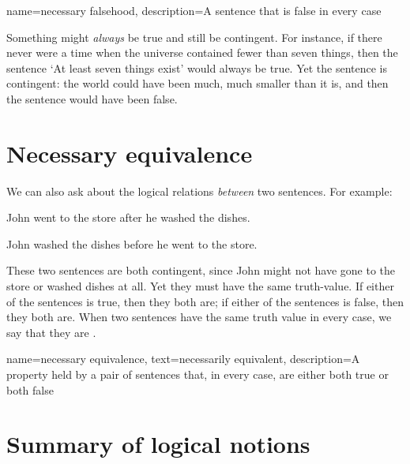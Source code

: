 {
name={necessary falsehood},
description={A sentence that is false in every case}
}

Something might \emph{always} be true and still be contingent. For instance, if there never were a time when the universe contained fewer than seven things, then the sentence `At least seven things exist' would always be true. Yet the sentence is contingent: the world could have been much, much smaller than it is, and then the sentence would have been false.

\section{Necessary equivalence}

We can also ask about the logical relations \emph{between} two sentences. For example:
\begin{compactlist}
\item[] John went to the store after he washed the dishes.
\item[] John washed the dishes before he went to the store.
\end{compactlist}
These two sentences are both contingent, since John might not have gone to the store or washed dishes at all. Yet they must have the same truth-value. If either of the sentences is true, then they both are; if either of the sentences is false, then they both are. When two sentences have the same truth value in every case, we say that they are .

{
name={necessary equivalence},
text={necessarily equivalent},
description={A property held by a pair of sentences that, in every case, are either both true or both false}
}


\section*{Summary of logical notions}

